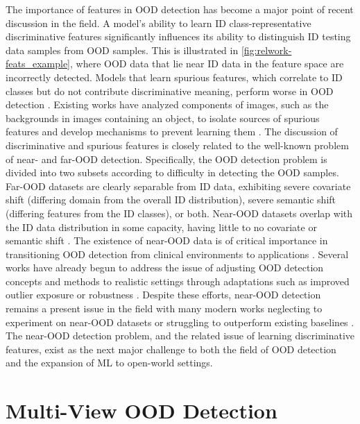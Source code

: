 The importance of features in OOD detection has become a major point of recent discussion in the field. A model's ability to learn ID class-representative discriminative features significantly influences its ability to distinguish ID testing data samples from OOD samples. This is illustrated in \ref{fig:relwork-feats_example}, where OOD data that lie near ID data in the feature space are incorrectly detected. Models that learn spurious features, which correlate to ID classes but do not contribute discriminative meaning, perform worse in OOD detection \cite{zhang2023openood,salehi2022unified}. Existing works have analyzed components of images, such as the backgrounds in images containing an object, to isolate sources of spurious features and develop mechanisms to prevent learning them \cite{ming2022exploit,neuhaus2023spurious}. The discussion of discriminative and spurious features is closely related to the well-known problem of near- and far-OOD detection. Specifically, the OOD detection problem is divided into two subsets according to difficulty in detecting the OOD samples. Far-OOD datasets are clearly separable from ID data, exhibiting severe covariate shift (differing domain from the overall ID distribution), severe semantic shift (differing features from the ID classes), or both. Near-OOD datasets overlap with the ID data distribution in some capacity, having little to no covariate or semantic shift \cite{yang2022openood,wang2023connecting,winkens2020contrastive,zhang2023openood}. The existence of near-OOD data is of critical importance in transitioning OOD detection from clinical environments to applications \cite{salehi2022unified,khazaie2022towards,wu2025out,zhang2021understanding,vaze2022generalized}. Several works have already begun to address the issue of adjusting OOD detection concepts and methods to realistic settings through adaptations such as improved outlier exposure \cite{azizmalayeri2022your} or robustness \cite{chen2020robust,meinke2022provably}. Despite these efforts, near-OOD detection remains a present issue in the field with many modern works neglecting to experiment on near-OOD datasets or struggling to outperform existing baselines \cite{gong2025out,ling2025cadref}. The near-OOD detection problem, and the related issue of learning discriminative features, exist as the next major challenge to both the field of OOD detection and the expansion of ML to open-world settings.

\section{Multi-View OOD Detection}
\label{sec:relwork-mvood}

